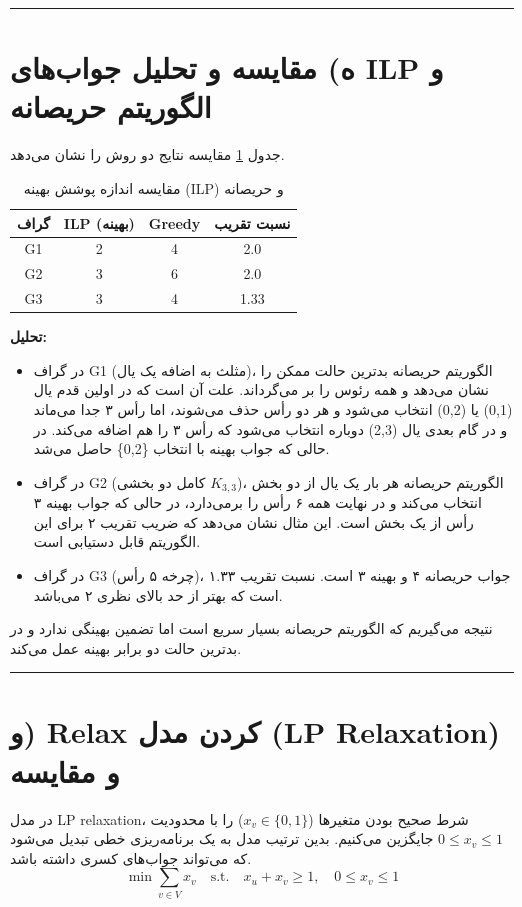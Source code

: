 \documentclass[11pt,a4paper]{article}
\newcommand{\en}[1]{\textenglish{#1}}
\newcommand{\separator}{\vspace{1em}\noindent\rule{\linewidth}{0.4pt}\vspace{1em}}
\begin{document}
\separator

\section{ه) مقایسه و تحلیل جواب‌های \en{ILP} و الگوریتم حریصانه}
جدول \ref{tab:compare} مقایسه نتایج دو روش را نشان می‌دهد.

\begin{table}[h!]
\centering
\caption{مقایسه اندازه پوشش بهینه (\en{ILP}) و حریصانه}
\label{tab:compare}
\begin{tabular}{|c|c|c|c|}
\hline
\textbf{گراف} & \textbf{\en{ILP} (بهینه)} & \textbf{\en{Greedy}} & \textbf{نسبت تقریب} \\
\hline
\en{G1} & 2 & 4 & 2.0 \\
\en{G2} & 3 & 6 & 2.0 \\
\en{G3} & 3 & 4 & 1.33 \\
\hline
\end{tabular}
\end{table}

\textbf{تحلیل:}
\begin{itemize}
\item در گراف \en{G1} (مثلث به اضافه یک یال)، الگوریتم حریصانه بدترین حالت ممکن را نشان می‌دهد و همه رئوس را بر می‌گرداند. علت آن است که در اولین قدم یال (0,1) یا (0,2) انتخاب می‌شود و هر دو رأس حذف می‌شوند، اما رأس ۳ جدا می‌ماند و در گام بعدی یال (2,3) دوباره انتخاب می‌شود که رأس ۳ را هم اضافه می‌کند. در حالی که جواب بهینه با انتخاب \{0,2\} حاصل می‌شد.
\item در گراف \en{G2} (کامل دو بخشی \( K_{3,3} \))، الگوریتم حریصانه هر بار یک یال از دو بخش انتخاب می‌کند و در نهایت همه ۶ رأس را برمی‌دارد، در حالی که جواب بهینه ۳ رأس از یک بخش است. این مثال نشان می‌دهد که ضریب تقریب ۲ برای این الگوریتم قابل دستیابی است.
\item در گراف \en{G3} (چرخه ۵ رأس)، جواب حریصانه ۴ و بهینه ۳ است. نسبت تقریب ۱.۳۳ است که بهتر از حد بالای نظری ۲ می‌باشد.
\end{itemize}
نتیجه می‌گیریم که الگوریتم حریصانه بسیار سریع است اما تضمین بهینگی ندارد و در بدترین حالت دو برابر بهینه عمل می‌کند.

\separator

\section{و) \en{Relax} کردن مدل (\en{LP Relaxation}) و مقایسه}
در مدل \en{LP relaxation}، شرط صحیح بودن متغیرها (\( x_v \in \{0,1\} \)) را با محدودیت \( 0 \leq x_v \leq 1 \) جایگزین می‌کنیم. بدین ترتیب مدل به یک برنامه‌ریزی خطی تبدیل می‌شود که می‌تواند جواب‌های کسری داشته باشد.
\[
\min \sum_{v \in V} x_v \quad \text{s.t.} \quad x_u+x_v \geq 1, \quad 0 \leq x_v \leq 1
\]
\end{document}
